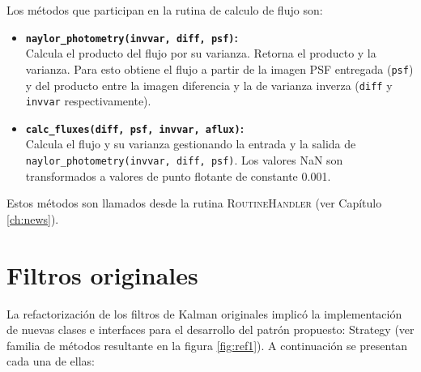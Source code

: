 Los m\'etodos que participan en la rutina de calculo de flujo son: 

\begin{itemize}
\item \textbf{\texttt{naylor\_photometry(invvar, diff, psf)}\cite{naylor}:}\\
Calcula el producto del flujo por su varianza. Retorna el producto y la varianza. Para esto obtiene el flujo a partir de la imagen PSF entregada (\texttt{psf}) y del producto entre la imagen diferencia y la de varianza inverza (\texttt{diff} y \texttt{invvar} respectivamente).
\bigskip


\item \textbf{\texttt{calc\_fluxes(diff, psf, invvar, aflux)}:}\\
Calcula el flujo y su varianza gestionando la entrada y la salida de \texttt{naylor\_photometry(invvar, diff, psf)}. Los valores NaN son transformados a valores de punto flotante de constante 0.001.
\end{itemize} 

Estos m\'etodos  son llamados desde la rutina \textsc{RoutineHandler} (ver Cap\'itulo \ref{ch:news}).
\section{Filtros originales}
La refactorizaci\'on de los filtros de Kalman originales implic\'o la implementaci\'on de nuevas clases e interfaces para el desarrollo del patr\'on propuesto: Strategy (ver familia de m\'etodos resultante en la figura \ref{fig:ref1}). A continuaci\'on se presentan cada una de ellas:

